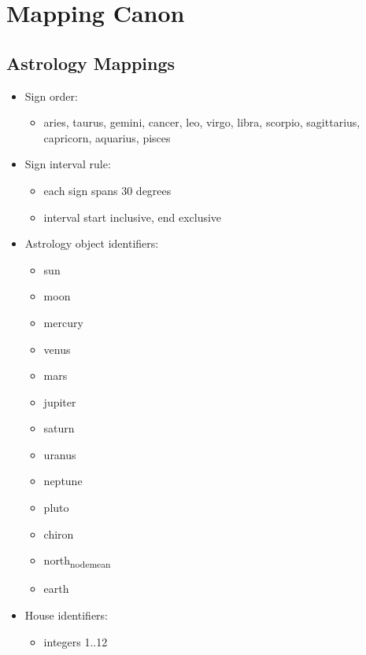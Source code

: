 \documentclass[11pt]{article}
\begin{document}
\section{Mapping Canon}
\label{sec:orgef5e73f}
\subsection{Astrology Mappings}
\label{sec:org937123d}
\begin{itemize}
\item Sign order:
\begin{itemize}
\item aries, taurus, gemini, cancer, leo, virgo, libra, scorpio, sagittarius, capricorn, aquarius, pisces
\end{itemize}
\item Sign interval rule:
\begin{itemize}
\item each sign spans 30 degrees
\item interval start inclusive, end exclusive
\end{itemize}
\item Astrology object identifiers:
\begin{itemize}
\item sun
\item moon
\item mercury
\item venus
\item mars
\item jupiter
\item saturn
\item uranus
\item neptune
\item pluto
\item chiron
\item north\textsubscript{node}\textsubscript{mean}
\item earth
\end{itemize}
\item House identifiers:
\begin{itemize}
\item integers 1..12
\end{itemize}
\end{itemize}
\end{document}
